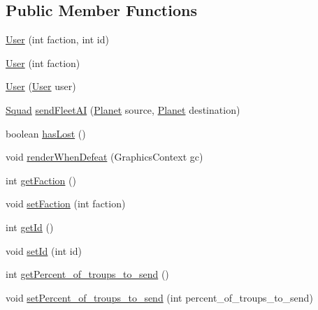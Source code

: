 \subsection*{Public Member Functions}
\begin{DoxyCompactItemize}
\item 
\hyperlink{classfr_1_1projet_1_1groupe40_1_1client_1_1_user_ad05b0747c066a5ee35cd9757c78b0e79}{User} (int faction, int id)
\item 
\hyperlink{classfr_1_1projet_1_1groupe40_1_1client_1_1_user_abb1c1439d37610e687fef97ef9739847}{User} (int faction)
\item 
\hyperlink{classfr_1_1projet_1_1groupe40_1_1client_1_1_user_abd0f6ca78045b1882f0e4f576de351ac}{User} (\hyperlink{classfr_1_1projet_1_1groupe40_1_1client_1_1_user}{User} user)
\item 
\hyperlink{classfr_1_1projet_1_1groupe40_1_1model_1_1ships_1_1_squad}{Squad} \hyperlink{classfr_1_1projet_1_1groupe40_1_1client_1_1_user_ae92f13258745de76aec592e0f86c63c6}{send\+Fleet\+AI} (\hyperlink{classfr_1_1projet_1_1groupe40_1_1model_1_1board_1_1_planet}{Planet} source, \hyperlink{classfr_1_1projet_1_1groupe40_1_1model_1_1board_1_1_planet}{Planet} destination)
\item 
boolean \hyperlink{classfr_1_1projet_1_1groupe40_1_1client_1_1_user_ad73c37bc0d6cecbd3c80bb3bb4d8abea}{has\+Lost} ()
\item 
void \hyperlink{classfr_1_1projet_1_1groupe40_1_1client_1_1_user_abefc893a751c16f2429593717fee0dda}{render\+When\+Defeat} (Graphics\+Context gc)
\item 
int \hyperlink{classfr_1_1projet_1_1groupe40_1_1client_1_1_user_a8bba484aaed66955962f9ebae579286d}{get\+Faction} ()
\item 
void \hyperlink{classfr_1_1projet_1_1groupe40_1_1client_1_1_user_a175c4059c0dd6fa229ae593de560777f}{set\+Faction} (int faction)
\item 
int \hyperlink{classfr_1_1projet_1_1groupe40_1_1client_1_1_user_a521f0939031b70091a061ba0ef6907cf}{get\+Id} ()
\item 
void \hyperlink{classfr_1_1projet_1_1groupe40_1_1client_1_1_user_aaee35ff762f9b12a3819c645c25d7dd5}{set\+Id} (int id)
\item 
int \hyperlink{classfr_1_1projet_1_1groupe40_1_1client_1_1_user_a7d0087e12b325e0d09be7e64556d3183}{get\+Percent\+\_\+of\+\_\+troups\+\_\+to\+\_\+send} ()
\item 
void \hyperlink{classfr_1_1projet_1_1groupe40_1_1client_1_1_user_a2eef817de379ad3bf873c7960df2f2cc}{set\+Percent\+\_\+of\+\_\+troups\+\_\+to\+\_\+send} (int percent\+\_\+of\+\_\+troups\+\_\+to\+\_\+send)

\end{DoxyCompactItemize}
